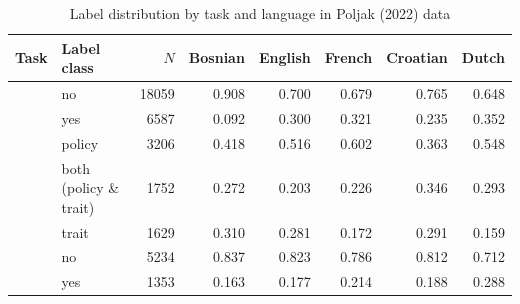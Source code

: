 \begin{table}[!t]

\caption{\label{tab:label_distribution_by_lang_poljak_2022}Label distribution by task and language in Poljak (2022) data}
\centering
\fontsize{10}{12}\selectfont
\begin{tabular}[t]{>{\raggedright\arraybackslash}L{1.5in}lrrrrrr}
\toprule
\headrow Task & Label class & $N$ & Bosnian & English & French & Croatian & Dutch\\
\midrule
 & no & 18059 & 0.908 & 0.700 & 0.679 & 0.765 & 0.648\\

 & yes & 6587 & 0.092 & 0.300 & 0.321 & 0.235 & 0.352\\
 & policy & 3206 & 0.418 & 0.516 & 0.602 & 0.363 & 0.548\\

 & both (policy \& trait) & 1752 & 0.272 & 0.203 & 0.226 & 0.346 & 0.293\\

 & trait & 1629 & 0.310 & 0.281 & 0.172 & 0.291 & 0.159\\
 & no & 5234 & 0.837 & 0.823 & 0.786 & 0.812 & 0.712\\

 & yes & 1353 & 0.163 & 0.177 & 0.214 & 0.188 & 0.288\\
\bottomrule
\end{tabular}
\end{table}
